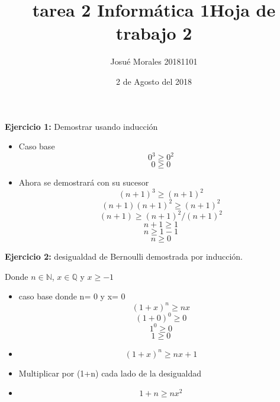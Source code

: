 \documentclass[10pt,a4paper]{article}
\author{Josué Morales 20181101}
\title{tarea 2 Informática 1}
\date{2 de Agosto del 2018}
\begin{document}
 \title{\bf Hoja de trabajo 2}
 \maketitle
{\bf Ejercicio 1:}
Demostrar usando inducción
  \begin{itemize}
  \item Caso base 
  \[ 0^3 \geq 0^2\]
  \[0 \geq 0\]  
 \item Ahora se demostrará con su sucesor
  \[(n+1)^3 \geq (n+1)^2\]
\[(n+1)(n+1)^2 \geq (n+1)^2\]
\[(n+1)\geq (n+1)^2/(n+1)^2\]  
\[n+1\geq 1\]  
\[n\geq 1-1\]  
\[n\geq 0\]  
  \end{itemize}

{\bf Ejercicio 2:} desigualdad de Bernoulli demostrada por inducción.

Donde $n\in \mathbb{N}$, $x\in \mathbb{Q}$ y $x\geq -1$
\begin{itemize} 
      	\item caso base donde n= 0 y x= 0
\[(1+x)^n\geq nx\]
\[(1+0)^0\geq 0\]   
\[1^0\geq 0\]   
\[1\geq 0\]  
\item \[(1+x)^n\geq nx + 1 \] 
\item Multiplicar por (1+n) cada lado de la desigualdad
\item \[1+n\geq nx^2\]
  	  \end{itemize}
  	
  	

 
\end{document}
